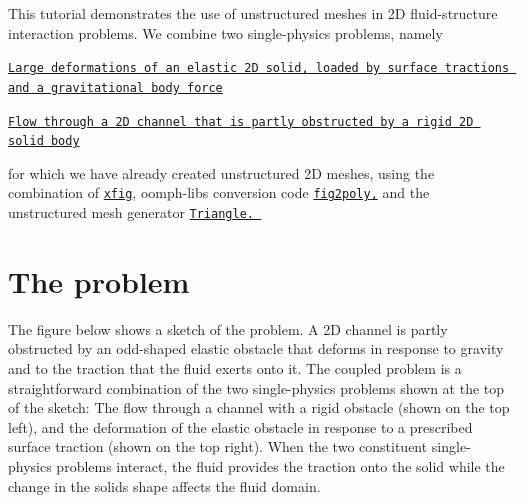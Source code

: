 This tutorial demonstrates the use of unstructured meshes in 2D fluid-\/structure interaction problems. We combine two single-\/physics problems, namely
\begin{DoxyItemize}
\item \href{../../../solid/unstructured_solid/html/index.html}{\tt Large deformations of an elastic 2D solid, loaded by surface tractions and a gravitational body force} ~\newline
~\newline

\item \href{../../../navier_stokes/unstructured_fluid/html/index.html}{\tt Flow through a 2D channel that is partly obstructed by a rigid 2D solid body}
\end{DoxyItemize}for which we have already created unstructured 2D meshes, using the combination of \href{http://en.wikipedia.org/wiki/Xfig}{\tt xfig}, {\ttfamily oomph-\/lib\textquotesingle{}s} conversion code \href{../../../meshes/mesh_from_xfig/html/index.html}{\tt {\ttfamily fig2poly},} and the unstructured mesh generator \href{http://www.cs.cmu.edu/~quake/triangle.html}{\tt {\ttfamily Triangle}. }



 

\hypertarget{index_the_problem}{}\section{The problem}\label{index_the_problem}
The figure below shows a sketch of the problem. A 2D channel is partly obstructed by an odd-\/shaped elastic obstacle that deforms in response to gravity and to the traction that the fluid exerts onto it. The coupled problem is a straightforward combination of the two single-\/physics problems shown at the top of the sketch\+: The flow through a channel with a rigid obstacle (shown on the top left), and the deformation of the elastic obstacle in response to a prescribed surface traction (shown on the top right). When the two constituent single-\/physics problems interact, the fluid provides the traction onto the solid while the change in the solid\textquotesingle{}s shape affects the fluid domain.

